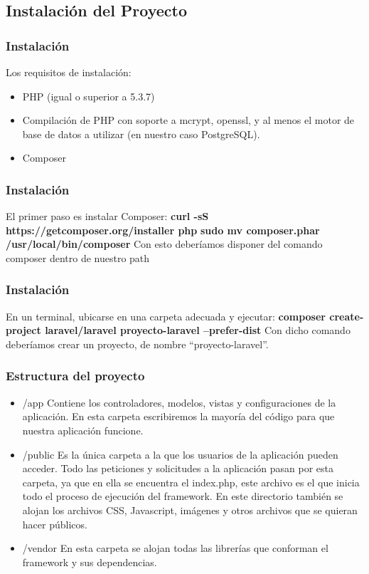 \documentclass[12pt]{beamer}
\begin{document}
\subsection{Instalación del Proyecto}

\begin{frame}
 \frametitle{Instalación}
 Los requisitos de instalación:
 \begin{itemize}
  \item PHP (igual o superior a 5.3.7)
  \item Compilación de PHP con soporte a mcrypt, openssl, y al menos el motor de base de datos a utilizar (en nuestro caso PostgreSQL).
  \item Composer
 \end{itemize}
\end{frame}


\begin{frame}
 \frametitle{Instalación}
 El primer paso es instalar Composer:
 \newline
 {\bf curl -sS https://getcomposer.org/installer \textbar  php}
 \newline
 {\bf sudo mv composer.phar /usr/local/bin/composer}
 \newline
 Con esto deberíamos disponer del comando composer dentro de nuestro path
\end{frame}


\begin{frame}
 \frametitle{Instalación}
 En un terminal, ubicarse en una carpeta adecuada y ejecutar:
 \newline
 {\bf composer create-project laravel/laravel proyecto-laravel --prefer-dist}
 \newline
 Con dicho comando deberíamos crear un proyecto, de nombre ``proyecto-laravel''.
\end{frame}


\begin{frame}
 \frametitle{Estructura del proyecto}
 \begin{itemize}
  \item<2-> \alert{/app} Contiene los controladores, modelos, vistas y configuraciones de la aplicación. En esta carpeta escribiremos la mayoría del código para que nuestra aplicación funcione.
  \item<3-> \alert{/public} Es la única carpeta a la que los usuarios de la aplicación pueden acceder. Todo las peticiones y solicitudes a la aplicación pasan por esta carpeta, ya que en ella se encuentra el index.php, este archivo es el que inicia todo el proceso de ejecución del framework. En este directorio también se alojan los archivos CSS, Javascript, imágenes y otros archivos que se quieran hacer públicos.
  \item<4-> \alert{/vendor} En esta carpeta se alojan todas las librerías que conforman el framework y sus dependencias.
 \end{itemize}
\end{frame}
\end{document}
